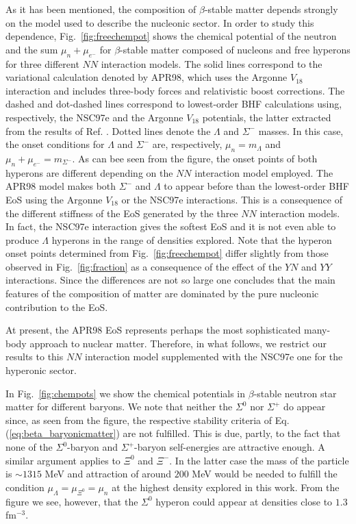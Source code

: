 As it has been mentioned, the composition of $\beta$-stable matter 
depends strongly on the model used to describe the nucleonic sector. 
In order to study this dependence, Fig.\
\ref{fig:freechempot} shows the chemical potential of the neutron and 
the sum
$\mu_{n}+\mu_{e^-}$ for 
$\beta$-stable matter composed of nucleons and 
free hyperons for three different $NN$ interaction models.
The solid lines correspond to the variational calculation denoted
by APR98, which uses the Argonne $V_{18}$ interaction and includes
three-body forces and relativistic boost corrections. The dashed
and dot-dashed lines correspond to lowest-order BHF calculations
using, respectively, the NSC97e and the Argonne $V_{18}$ potentials, the
latter extracted from the results of Ref. \cite{bbs00}.
Dotted lines denote the $\Lambda$ and
$\Sigma^-$ masses. In this case, the onset conditions for $\Lambda$ and
$\Sigma^-$ are, respectively, $\mu_{n}=m_{\Lambda}$ and
$\mu_{n}+\mu_{e^-}=m_{\Sigma^-}$. As can bee seen from the
figure, the onset points of both hyperons are
different depending on the $NN$ interaction model employed. 
The APR98 model makes both $\Sigma^-$ and $\Lambda$ to appear 
before than the lowest-order BHF EoS using the Argonne
$V_{18}$ or the NSC97e interactions. 
This is a consequence of the
different stiffness of the EoS generated by the three $NN$ interaction
models. 
In fact, the NSC97e interaction gives the
softest EoS and it is not even able to produce $\Lambda$ hyperons in
the range of densities explored. 
Note that the hyperon onset points determined from
Fig.~\ref{fig:freechempot}
differ slightly from those observed in Fig.~\ref{fig:fraction} 
as a consequence of the effect of the $YN$ and
$YY$ interactions. Since the differences are not so large one
concludes that
the main features of the composition of matter are dominated by
the pure nucleonic contribution to the EoS.

At present, the APR98 EoS represents perhaps
the most sophisticated many-body approach to nuclear matter. Therefore,
in what follows, we restrict our results to this $NN$ interaction model 
supplemented with the NSC97e one 
for the hyperonic sector. 

In Fig.\ \ref{fig:chempots} we show
the chemical potentials in $\beta$-stable neutron star matter for
different baryons. We note that  
neither the $\Sigma^0$ nor $\Sigma^+$
do appear since, as seen from the figure, the respective stability criteria
of Eq. (\ref{eq:beta_baryonicmatter}) are not fulfilled.
This is due, partly, to the fact that none of the $\Sigma^0$-baryon 
and
$\Sigma^+$-baryon self-energies
are attractive enough. A similar argument applies to
$\Xi^0$ and $\Xi^-$. In the latter case the mass of the particle is $\sim
1315$ MeV and attraction of around $200$ MeV would be needed to fulfill the
condition $\mu_{\Lambda}=\mu_{\Xi^0}=\mu_{n}$ at the
highest density explored in this work. From the figure we see,
however, that the $\Sigma^0$ hyperon could appear at densities 
close to $1.3$
fm$^{-3}$. 

